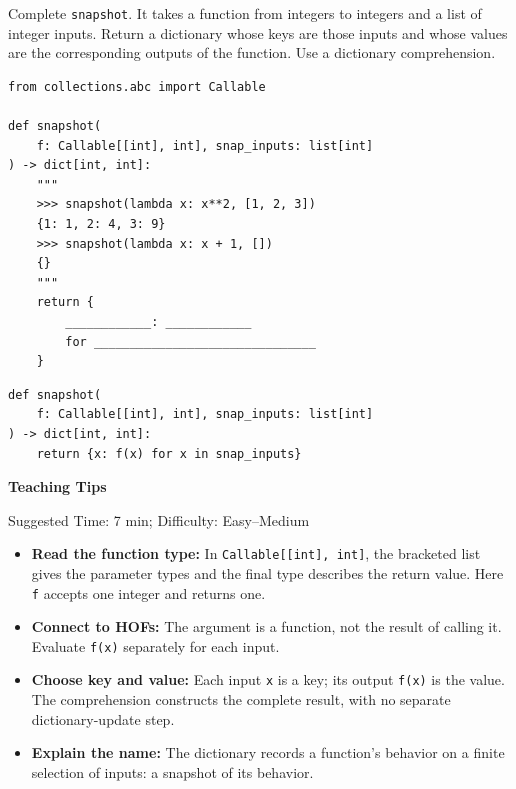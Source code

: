 \begin{blocksection}
\question Complete \lstinline{snapshot}. It takes a function from integers
to integers and a list of integer inputs. Return a dictionary whose keys are
those inputs and whose values are the corresponding outputs of the function.
Use a dictionary comprehension.

\begin{lstlisting}
from collections.abc import Callable

def snapshot(
    f: Callable[[int], int], snap_inputs: list[int]
) -> dict[int, int]:
    """
    >>> snapshot(lambda x: x**2, [1, 2, 3])
    {1: 1, 2: 4, 3: 9}
    >>> snapshot(lambda x: x + 1, [])
    {}
    """
    return {
        ____________: ____________
        for _______________________________
    }
\end{lstlisting}
\begin{solution}
\begin{lstlisting}
def snapshot(
    f: Callable[[int], int], snap_inputs: list[int]
) -> dict[int, int]:
    return {x: f(x) for x in snap_inputs}
\end{lstlisting}
\end{solution}
\end{blocksection}

\begin{questionmeta}
\textbf{Teaching Tips}\par\nopagebreak[4]
Suggested Time: 7 min; Difficulty: Easy--Medium
\nopagebreak[4]
\begin{itemize}
    \item \textbf{Read the function type:} In \lstinline{Callable[[int], int]},
    the bracketed list gives the parameter types and the final type describes
    the return value. Here \lstinline{f} accepts one integer and returns one.
    \item \textbf{Connect to HOFs:} The argument is a function, not the result
    of calling it. Evaluate \lstinline{f(x)} separately for each input.
    \item \textbf{Choose key and value:} Each input \lstinline{x} is a key;
    its output \lstinline{f(x)} is the value. The comprehension constructs
    the complete result, with no separate dictionary-update step.
    \item \textbf{Explain the name:} The dictionary records a function's
    behavior on a finite selection of inputs: a snapshot of its behavior.
\end{itemize}
\end{questionmeta}
